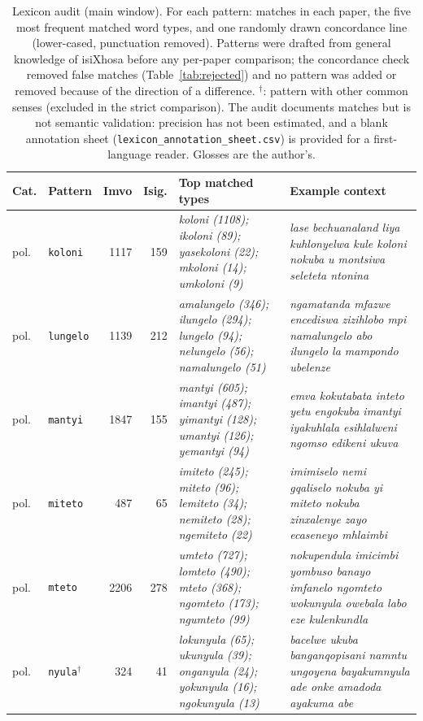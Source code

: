 \begin{table}[h]\centering\scriptsize\caption{Lexicon audit (main window). For each pattern: matches in each paper, the five most frequent matched word types, and one randomly drawn concordance line (lower-cased, punctuation removed). Patterns were drafted from general knowledge of isiXhosa before any per-paper comparison; the concordance check removed false matches (Table~\ref{tab:rejected}) and no pattern was added or removed because of the direction of a difference. $^\dagger$: pattern with other common senses (excluded in the strict comparison). The audit documents matches but is not semantic validation: precision has not been estimated, and a blank annotation sheet (\texttt{lexicon\_annotation\_sheet.csv}) is provided for a first-language reader. Glosses are the author's.}
\begin{tabular}{@{}llrrp{}p{}@{}}\toprule Cat. & Pattern & Imvo & Isig. & Top matched types & Example context \\ \midrule
pol. & \texttt{koloni} & 1117 & 159 & \emph{koloni (1108); ikoloni (89); yasekoloni (22); mkoloni (14); umkoloni (9)} & \emph{lase bechuanaland liya kuhlonyelwa kule koloni nokuba u montsiwa seleteta ntonina} \\
pol. & \texttt{lungelo} & 1139 & 212 & \emph{amalungelo (346); ilungelo (294); lungelo (94); nelungelo (56); namalungelo (51)} & \emph{ngamatanda mfazwe encediswa zizihlobo mpi namalungelo abo ilungelo la mampondo ubelenze} \\
pol. & \texttt{mantyi} & 1847 & 155 & \emph{mantyi (605); imantyi (487); yimantyi (128); umantyi (126); yemantyi (94)} & \emph{emva kokutabata inteto yetu engokuba imantyi iyakuhlala esihlalweni ngomso edikeni ukuva} \\
pol. & \texttt{miteto} & 487 & 65 & \emph{imiteto (245); miteto (96); lemiteto (34); nemiteto (28); ngemiteto (22)} & \emph{imimiselo nemi gqaliselo nokuba yi miteto nokuba zinxalenye zayo ecaseneyo mhlaimbi} \\
pol. & \texttt{mteto} & 2206 & 278 & \emph{umteto (727); lomteto (490); mteto (368); ngomteto (173); ngumteto (99)} & \emph{nokupendula imicimbi yombuso banayo imfanelo ngomteto wokunyula owebala labo eze kulenkundla} \\
pol. & \texttt{nyula}$^\dagger$ & 324 & 41 & \emph{lokunyula (65); ukunyula (39); onganyula (24); yokunyula (16); ngokunyula (13)} & \emph{bacelwe ukuba banganqopisani namntu ungoyena bayakumnyula ade onke amadoda ayakuma abe} \\

\end{tabular}
\end{table}
